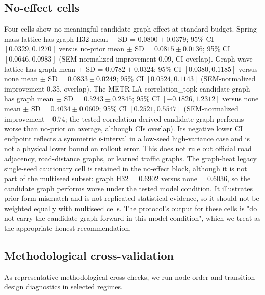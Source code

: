 \documentclass[preprint,12pt]{elsarticle}
\begin{document}
\subsection{No-effect cells}
\label{sec:no-effect}

Four cells show no meaningful candidate-graph effect at standard 
budget. Spring-mass lattice has graph H32 mean \(\pm\) SD = \(0.0800 \pm 0.0379\); 95\% CI \([0.0329,0.1270]\) versus 
no-prior mean \(\pm\) SD = \(0.0815 \pm 0.0136\); 95\% CI \([0.0646,0.0983]\) (SEM-normalized improvement 0.09, CI overlap). Graph-wave lattice 
has graph mean \(\pm\) SD = \(0.0782 \pm 0.0324\); 95\% CI \([0.0380,0.1185]\) versus none mean \(\pm\) SD = \(0.0833 \pm 0.0249\); 95\% CI \([0.0524,0.1143]\) (SEM-normalized improvement 0.35, 
overlap). The METR-LA correlation\_topk candidate graph has graph mean \(\pm\) SD = \(0.5243 \pm 0.2845\); 95\% CI \([-0.1826,1.2312]\) versus 
none mean \(\pm\) SD = \(0.4034 \pm 0.0609\); 95\% CI \([0.2521,0.5547]\) (SEM-normalized improvement $-0.74$; the tested correlation-derived candidate graph performs 
worse than no-prior on average, although CIs overlap). Its negative lower CI endpoint reflects a symmetric \(t\)-interval in a low-seed high-variance case and is not a physical lower bound on rollout error. This does not rule out official road adjacency, road-distance graphs, or learned traffic graphs. The graph-heat legacy single-seed cautionary cell is retained in the 
no-effect block, although it is not part of the multiseed subset: 
graph H32 = 0.6902 versus none = 0.6036, so the candidate graph 
performs worse under the tested model condition. It illustrates prior-form mismatch and is not replicated statistical evidence, so it should not be weighted equally with multiseed cells. The protocol's 
output for these cells is "do not carry the candidate graph forward 
in this model condition", which we treat as the appropriate honest 
recommendation.

\subsection{Methodological cross-validation}
\label{sec:cross-val}

As representative methodological cross-checks, we run node-order and 
transition-design diagnostics in selected regimes.
\end{document}
